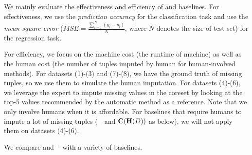 We mainly evaluate the effectiveness and efficiency of \ours and  baselines. For effectiveness, we use the {\it prediction accuracy} for the classification task and use the {\it mean square error} ($MSE = \frac{\sum_{i=1}^N(y_i-\hat{y}_i)}{N}$, where $N$ denotes the size of test set) for the regression task. 

For efficiency, we focus on the machine cost (\ie the runtime of machine) as well as the human cost (the number of tuples imputed by human for human-involved methods). For datasets (1)-(3) and (7)-(8), we have the ground truth of missing tuples, so we use them to simulate the human imputation. For datasets (4)-(6), we leverage the expert to impute missing values in the coreset by looking at the top-5 values recommended by the automatic method as a reference. Note that we only involve humans when it is affordable. For baselines that require humans to impute a lot of missing tuples (\ie~\truth~and $\mathbf{C}(\mathbf{H}(D))$ as below), we will not apply them on datasets (4)-(6).

 We compare \ours and \ours$^+$ with a variety of baselines.







